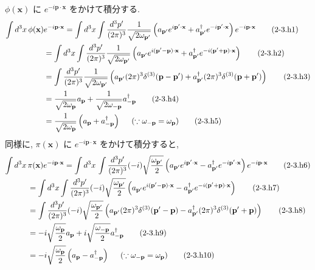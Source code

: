 \documentclass[a4paper,12pt]{article}
\begin{document}
$\phi(\mathbf{x})$ に $e^{-i\mathbf{p}\cdot\mathbf{x}}$ をかけて積分する.
\begin{align*}
    \int d^3x \, \phi(\mathbf{x}) &e^{-i\mathbf{p}\cdot\mathbf{x}} = \int d^3x \int \frac{d^3p'}{(2\pi)^3} \frac{1}{\sqrt{2\omega_{\mathbf{p}'}}} \left( a_{\mathbf{p}'} e^{i\mathbf{p}'\cdot\mathbf{x}} + a^\dagger_{\mathbf{p}'} e^{-i\mathbf{p}'\cdot\mathbf{x}} \right) e^{-i\mathbf{p}\cdot\mathbf{x}} \tag{2-3.h1} \\
    &= \int d^3x \int \frac{d^3p'}{(2\pi)^3} \frac{1}{\sqrt{2\omega_{\mathbf{p}'}}} \left( a_{\mathbf{p}'} e^{i(\mathbf{p}'-\mathbf{p})\cdot\mathbf{x}} + a^\dagger_{\mathbf{p}'} e^{-i(\mathbf{p}'+\mathbf{p})\cdot\mathbf{x}} \right) \tag{2-3.h2} \\
    &= \int \frac{d^3p'}{(2\pi)^3} \frac{1}{\sqrt{2\omega_{\mathbf{p}'}}} \left( a_{\mathbf{p}'} (2\pi)^3 \delta^{(3)}(\mathbf{p} - \mathbf{p}') + a^\dagger_{\mathbf{p}'} (2\pi)^3 \delta^{(3)}(\mathbf{p} + \mathbf{p}') \right) \tag{2-3.h3} \\
    &= \frac{1}{\sqrt{2\omega_{\mathbf{p}}}} a_{\mathbf{p}} + \frac{1}{\sqrt{2\omega_{-\mathbf{p}}}} a^\dagger_{-\mathbf{p}} \tag{2-3.h4} \\
    &= \frac{1}{\sqrt{2\omega_{\mathbf{p}}}} \left( a_{\mathbf{p}} + a^\dagger_{-\mathbf{p}} \right) \hspace{0.5cm} (\because \omega_{-\mathbf{p}} = \omega_{\mathbf{p}}) \label{2-3.h5} \tag{2-3.h5}
\end{align*}
同様に, $\pi(\mathbf{x})$ に $e^{-i\mathbf{p}\cdot\mathbf{x}}$ をかけて積分すると,
\begin{align*}
    \int d^3x \, &\pi(\mathbf{x}) e^{-i\mathbf{p}\cdot\mathbf{x}} = \int d^3 x \, \int \frac{d^3p'}{(2\pi)^3} (-i) \sqrt{\frac{\omega_{\mathbf{p}'}}{2}} \left( a_{\mathbf{p}'} e^{i\mathbf{p}' \cdot\mathbf{x}} - a^\dagger_{\mathbf{p}'} e^{-i\mathbf{p}' \cdot\mathbf{x}} \right) e^{-i\mathbf{p}\cdot\mathbf{x}} \tag{2-3.h6} \\
    &= \int d^3x \int \frac{d^3p'}{(2\pi)^3} (-i) \sqrt{\frac{\omega_{\mathbf{p}'}}{2}} \left( a_{\mathbf{p}'} e^{i(\mathbf{p}'-\mathbf{p})\cdot\mathbf{x}} - a^\dagger_{\mathbf{p}'} e^{-i(\mathbf{p}'+\mathbf{p})\cdot\mathbf{x}} \right) \tag{2-3.h7} \\
    &= \int \frac{d^3p'}{(2\pi)^3} (-i) \sqrt{\frac{\omega_{\mathbf{p}'}}{2}} \left( a_{\mathbf{p}'} (2\pi)^3 \delta^{(3)}(\mathbf{p}' - \mathbf{p}) - a^\dagger_{\mathbf{p}'} (2\pi)^3 \delta^{(3)}(\mathbf{p}' + \mathbf{p}) \right) \tag{2-3.h8} \\
    &= -i \sqrt{\frac{\omega_{\mathbf{p}}}{2}} a_{\mathbf{p}} + i \sqrt{\frac{\omega_{-\mathbf{p}}}{2}} a^\dagger_{-\mathbf{p}} \tag{2-3.h9} \\
    &= -i \sqrt{\frac{\omega_{\mathbf{p}}}{2}} \left( a_{\mathbf{p}} - a^\dagger_{-\mathbf{p}} \right) \hspace{0.5cm} (\because \omega_{-\mathbf{p}} = \omega_{\mathbf{p}}) \label{2-3.h10} \tag{2-3.h10}
\end{align*}
\end{document}
